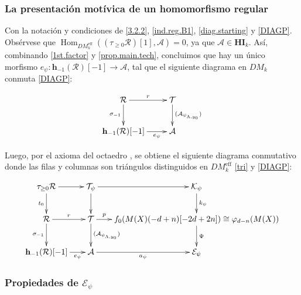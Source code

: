 \documentclass[10pt]{amsart}
\theoremstyle{definition}
\theoremstyle{remark}
\theoremstyle{definition}
\begin{document}
\subsubsection{La presentación motívica de un homomorfismo regular} Con la notación y condiciones de \ref{3.2.2}, \ref{ind.reg.B1}, \ref{diag.starting}  y \ref{DIAGP}. Obsérvese que $\operatorname{Hom}_{DM^{\mathrm{eff}}_{k}}((\tau_{\geq 0}\mathcal{R})[1], \mathcal{A})=0$, ya que $\mathcal{A}\in\mathbf{HI}_{k}$. Así, combinando \ref{1st.factor} y \ref{prop.main.tech}, concluimos que hay un único morfismo $e_{\psi}:\mathbf{h}_{-1}(\mathcal{R})[-1]\to\mathcal{A}$, tal que el siguiente diagrama en $DM_{k}$ conmuta \ref{DIAGP}:



\begin{align}  \label{DIAGCOMS}
\begin{split}
\xymatrix{\mathcal R  \ar[r]^-r \ar[d]_-{\sigma _{-1}}& \mathcal T  
\ar[d]^-{(\mathcal A _{\psi _{\Lambda , y_0}})} \\
\mathbf{h}_{-1} (\mathcal R )[-1]  \ar[r]_-{e_\psi}& \mathcal A }
\end{split}
\end{align}

Luego, por el axioma del octaedro \cite[Prop. 1.1.11]{BBD82}, se obtiene el siguiente diagrama conmutativo donde las filas y columnas son triángulos distinguidos en $DM_{k}^{\mathrm{eff}}$ \ref{tri} y \ref{DIAGP}:



\begin{align}  \label{diag.eff.regmot}
\begin{split}
\xymatrix@C=1.4pc{
\tau _{\geq 0} \mathcal R \ar[r] \ar[d]_-{t_0}& \mathcal T _{\psi} \ar[r] \ar[d]& 
 \mathcal K _{ \psi}  \ar[d]^-{k_\psi} \\
\mathcal R  \ar[r]^-r \ar[d]_-{\sigma _{-1}}& \mathcal T  \ar[r]^-p 
\ar[d]^-{(\mathcal A _{\psi _{\Lambda , y_0}})}
 & f_0(M(X)(-d+n)[-2d+2n]) \cong \varphi _{d-n}(M(X))\ar[d]^-{\Psi} \\
\mathbf{h}_{-1} (\mathcal R )[-1]  \ar[r]_-{e_\psi}& \mathcal A \ar[r]_-{a_\psi}&
\mathcal E _{\psi}}
\end{split}
\end{align}


\subsubsection{Propiedades de $\mathcal{E}_{\psi}$ }\label{OBS1}
\end{document}
